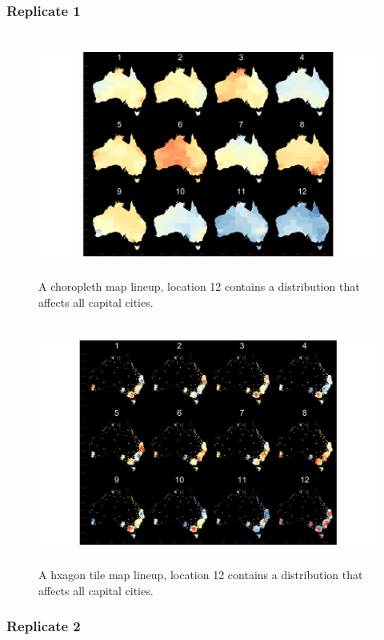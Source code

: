 \documentclass{monashthesis}
\begin{document}
\hypertarget{replicate-1}{%
\subsubsection{Replicate 1}\label{replicate-1}}

\begin{figure}[H]
\centering
\includegraphics[height=8cm]{lineups/cities-geo12-1.pdf}
\caption{\label{fig:cities-geo12}A choropleth map lineup, location 12 contains a distribution that affects all capital cities.}
\end{figure}

\begin{figure}[H]
\centering
\includegraphics[height=8cm]{lineups/cities-hex12-1.pdf}
\caption{\label{fig:cities-hex12}A hxagon tile map lineup, location 12 contains a distribution that affects all capital cities.}
\end{figure}

\hypertarget{replicate-2}{%
\subsubsection{Replicate 2}\label{replicate-2}}
\end{document}
